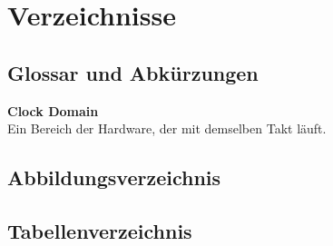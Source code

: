 \chapter{Verzeichnisse}




\renewcommand{\bibsection}{\section{\refname}}  %
\makeatletter
\makeatother






\section{Glossar und Abkürzungen}\label{glossar}

\textbf{Clock Domain}\\
Ein Bereich der Hardware, der mit demselben Takt läuft.


\section{Abbildungsverzeichnis}


\section{Tabellenverzeichnis}

